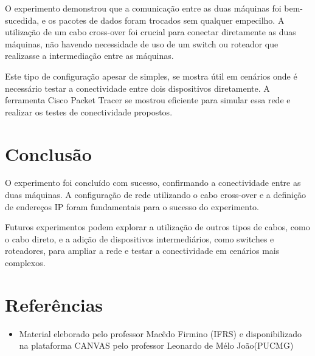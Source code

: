 \documentclass[12pt]{article}
\begin{document}
O experimento demonstrou que a comunicação entre as duas máquinas foi bem-sucedida, e os pacotes de dados foram trocados sem qualquer empecilho. A utilização de um cabo cross-over foi crucial para conectar diretamente as duas máquinas, não havendo necessidade de uso de um switch ou roteador que realizasse a intermediação entre as máquinas.

Este tipo de configuração apesar de simples, se mostra útil em cenários onde é necessário testar a conectividade entre dois dispositivos diretamente. A ferramenta Cisco Packet Tracer se mostrou eficiente para simular essa rede e realizar os testes de conectividade propostos.

\section{Conclusão}

O experimento foi concluído com sucesso, confirmando a conectividade entre as duas máquinas. A configuração de rede utilizando o cabo cross-over e a definição de endereços IP foram fundamentais para o sucesso do experimento.

Futuros experimentos podem explorar a utilização de outros tipos de cabos, como o cabo direto, e a adição de dispositivos intermediários, como switches e roteadores, para ampliar a rede e testar a conectividade em cenários mais complexos.

\section{Referências}
\begin{itemize}
    \item Material eleborado pelo professor Macêdo Firmino (IFRS) e disponibilizado na plataforma CANVAS pelo professor Leonardo de Mélo João(PUCMG)
\end{itemize}
\end{document}
